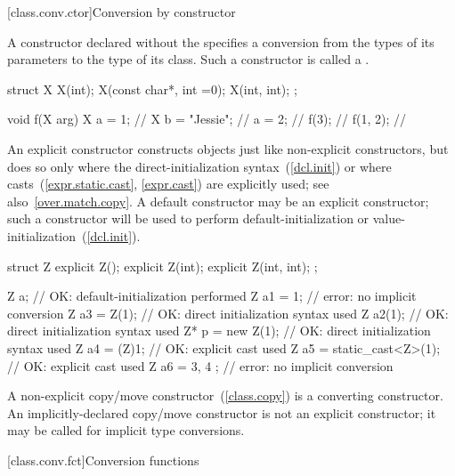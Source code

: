 [class.conv.ctor]{Conversion by constructor}%

\pnum
A constructor declared without the
specifies a conversion from
the types of its parameters
to the type of its class.
Such a constructor is called a
%
.
\enterexample

%
\begin{codeblock}
struct X {
    X(int);
    X(const char*, int =0);
    X(int, int);
};

void f(X arg) {
  X a = 1;          // 
  X b = "Jessie";   // 
  a = 2;            // 
  f(3);             // 
  f({1, 2});        // 
}
\end{codeblock}
\exitexample

\pnum
\enternote
An explicit constructor constructs objects just like non-explicit
constructors, but does so only where the direct-initialization syntax~(\ref{dcl.init}) or where casts~(\ref{expr.static.cast}, \ref{expr.cast}) are explicitly
used; see also~\ref{over.match.copy}.
A default constructor may be an explicit constructor; such a constructor
will be used to perform default-initialization
or value-initialization~(\ref{dcl.init}).
\enterexample

\begin{codeblock}
struct Z {
  explicit Z();
  explicit Z(int);
  explicit Z(int, int);
};

Z a;                            // OK: default-initialization performed
Z a1 = 1;                       // error: no implicit conversion
Z a3 = Z(1);                    // OK: direct initialization syntax used
Z a2(1);                        // OK: direct initialization syntax used
Z* p = new Z(1);                // OK: direct initialization syntax used
Z a4 = (Z)1;                    // OK: explicit cast used
Z a5 = static_cast<Z>(1);       // OK: explicit cast used
Z a6 = { 3, 4 };                // error: no implicit conversion
\end{codeblock}
\exitexample
\exitnote

\pnum
A
non-explicit
copy/move constructor~(\ref{class.copy}) is a converting constructor.
\enternote
An implicitly-declared copy/move constructor is not an explicit constructor;
it may be called for implicit type conversions.
\exitnote

[class.conv.fct]{Conversion functions}%
%
%
%

